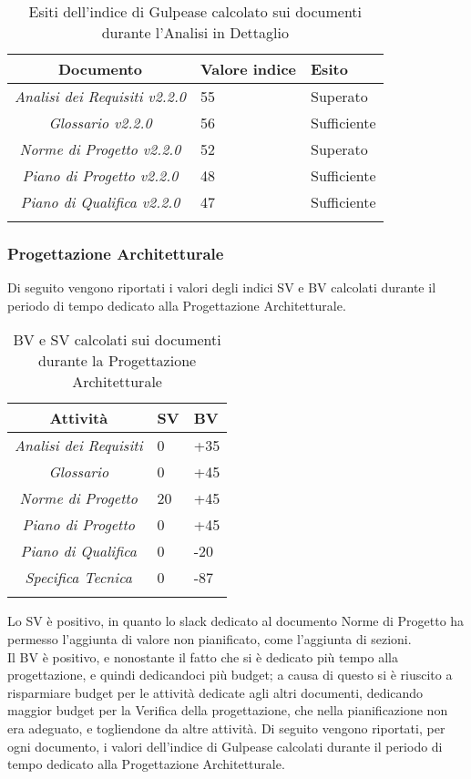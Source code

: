 \begin{longtable}{|c|p{3cm}|p{3cm}|}
\toprule
\textbf{Documento} & \textbf{Valore indice} & \textbf{Esito} \\


\midrule
\emph{Analisi dei Requisiti v2.2.0} & 55 & Superato \\
\midrule
\emph{Glossario v2.2.0} & 56 & Sufficiente\\
\midrule
\emph{Norme di Progetto v2.2.0} & 52 & Superato\\
\midrule
\emph{Piano di Progetto v2.2.0} & 48 & Sufficiente \\
\midrule
\emph{Piano di Qualifica v2.2.0} & 47 & Sufficiente \\
\bottomrule
\caption{Esiti dell'indice di Gulpease calcolato sui documenti durante l'Analisi in Dettaglio}
\label{tab:changelog}
\end{longtable}
\subsubsection{Progettazione Architetturale}
Di seguito vengono riportati i valori degli indici SV e BV calcolati durante il periodo di tempo dedicato alla Progettazione Architetturale.
\begin{longtable}{|c|p{3cm}|p{3cm}|}
\toprule
\textbf{Attività} & \textbf{SV} & \textbf{BV} \\


\midrule
\emph{Analisi dei Requisiti} & 0 & +35\\
\midrule
\emph{Glossario} & 0  & +45\\
\midrule
\emph{Norme di Progetto} & 20 & +45\\
\midrule
\emph{Piano di Progetto} & 0 & +45 \\
\midrule
\emph{Piano di Qualifica} & 0 & -20\\
\midrule
\emph{Specifica Tecnica} & 0 & -87\\
\bottomrule
\caption{BV e SV calcolati sui documenti durante la Progettazione Architetturale}
\label{tab:changelog}
\end{longtable}

Lo SV è positivo, in quanto lo slack dedicato al documento Norme di Progetto ha permesso l'aggiunta di valore non pianificato, come l'aggiunta di sezioni.\\
Il BV è positivo, e nonostante il fatto che si è dedicato più tempo alla progettazione, e quindi dedicandoci più budget; a causa di questo si è riuscito a risparmiare budget per le attività dedicate agli altri documenti, dedicando maggior budget per la Verifica della progettazione, che nella pianificazione non era adeguato, e togliendone da altre attività.
Di seguito vengono riportati, per ogni documento, i valori dell'indice di Gulpease calcolati durante il periodo di tempo dedicato alla Progettazione Architetturale.

